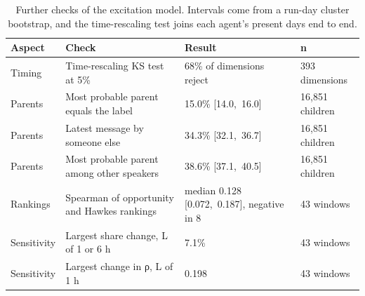 \documentclass{arxivtmpl}
\begin{document}
\begin{table}[htbp]
\centering
\small
\caption{Further checks of the excitation model. Intervals come from a run-day cluster bootstrap, and the time-rescaling test joins each agent's present days end to end.}
\begin{tabularx}{\linewidth}{lLLl}
\toprule
Aspect & Check & Result & n \\
\midrule
Timing & Time-rescaling KS test at 5\% & 68\% of dimensions reject & 393 dimensions \\
Parents & Most probable parent equals the label & 15.0\% [14.0,~16.0] & 16,851 children \\
Parents & Latest message by someone else & 34.3\% [32.1,~36.7] & 16,851 children \\
Parents & Most probable parent among other speakers & 38.6\% [37.1,~40.5] & 16,851 children \\
Rankings & Spearman of opportunity and Hawkes rankings & median 0.128 [0.072,~0.187], negative in 8 & 43 windows \\
Sensitivity & Largest share change, L of 1 or 6 h & 7.1\% & 43 windows \\
Sensitivity & Largest change in ρ, L of 1 h & 0.198 & 43 windows \\
\bottomrule
\end{tabularx}
\end{table}

\begin{table}[htbp]
\centering
\small
\caption{The excitation model against the LLM monitor. Share rows are differences in posterior parent-class shares between messages near a finding and the same agents' other messages. Percentile rows rank flagged pairs among all pairs of a window, where 50 is chance.}
\end{table}
\end{document}
